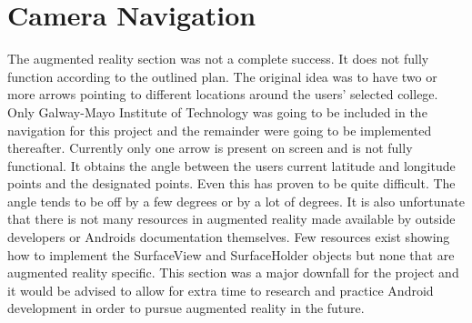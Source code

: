 \section{Camera Navigation}
The augmented reality section was not a complete success. It does not fully function according to the outlined plan. The original idea was to have two or more arrows pointing to different locations around the users' selected college. Only Galway-Mayo Institute of Technology was going to be included in the navigation for this project and the remainder were going to be implemented thereafter. Currently only one arrow is present on screen and is not fully functional. It obtains the angle between the users current latitude and longitude points and the designated points. Even this has proven to be quite difficult. The angle tends to be off by a few degrees or by a lot of degrees. It is also unfortunate that there is not many resources in augmented reality made available by outside developers or Androids documentation themselves. Few resources exist showing how to implement the SurfaceView and SurfaceHolder objects but none that are augmented reality specific. This section was a major downfall for the project and it would be advised to allow for extra time to research and practice Android development in order to pursue augmented reality in the future.

